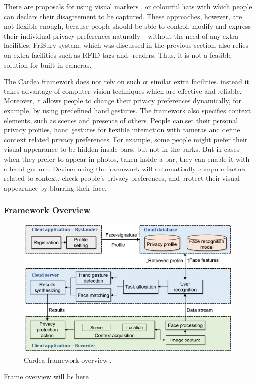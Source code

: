 \documentclass[conference]{IEEEtran}
\begin{document}
There are proposals for using visual markers \cite{roesner2014},\cite{liu2014} or colourful hats \cite{sastry2007} with which people can declare their disagreement to be captured. These approaches, however, are not flexible enough, because people should be able to control, modify and express their individual privacy preferences naturally – without the need of any extra facilities. PriSurv system, which was discussed in the previous section, also relies on extra facilities such as \ac{RFID}-tags and -readers. Thus, it is not a feasible solution for built-in cameras. 

The Cardea framework \cite{shu2016cardea} does not rely on such or similar extra facilities, instead it takes advantage of computer vision techniques which are effective and reliable. Moreover, it allows people to change their privacy preferences dynamically, for example, by using predefined hand gestures. The framework also specifies context elements, such as scenes and presence of others. People can set their personal privacy profiles, hand gestures for flexible interaction with cameras and define context related privacy preferences. For example, some people might prefer their visual appearance to be hidden inside bars, but not in the parks. But in cases when they prefer to appear in photos, taken inside a bar, they can enable it with a hand gesture. Devices using the framework will automatically compute factors related to context, check people's privacy preferences, and protect their visual appearance by blurring their face.


\subsubsection{Framework Overview}
\begin{figure}[t]
\centerline{\includegraphics[width=.5\textwidth]{img/cardea_overview_diagram.png}}
\caption{Cardea framework overview \cite{shu2016cardea}.}
\label{fig:cardea2}
\end{figure}

Frame overview will be here 
\end{document}
